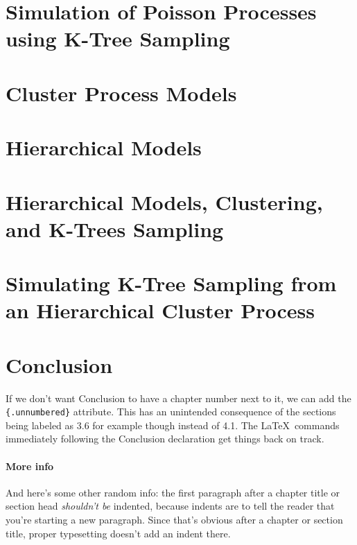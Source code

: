 \documentclass[12pt,twoside]{reedthesis}
\begin{document}
  \chapter{Simulation of Poisson Processes using K-Tree
  Sampling}\label{simulation-of-poisson-processes-using-k-tree-sampling}
  
  \chapter{Cluster Process Models}\label{cluster-process-models}
  
  \chapter{Hierarchical Models}\label{hierarchical-models}
  
  \chapter{Hierarchical Models, Clustering, and K-Trees
  Sampling}\label{hierarchical-models-clustering-and-k-trees-sampling}
  
  \chapter{Simulating K-Tree Sampling from an Hierarchical Cluster
  Process}\label{simulating-k-tree-sampling-from-an-hierarchical-cluster-process}
  
  \chapter*{Conclusion}\label{conclusion}
  
  \setcounter{chapter}{4} \setcounter{section}{0}
  
  If we don't want Conclusion to have a chapter number next to it, we can
  add the \texttt{\{.unnumbered\}} attribute. This has an unintended
  consequence of the sections being labeled as 3.6 for example though
  instead of 4.1. The \LaTeX~commands immediately following the Conclusion
  declaration get things back on track.
  
  \subsubsection{More info}\label{more-info}
  
  And here's some other random info: the first paragraph after a chapter
  title or section head \emph{shouldn't be} indented, because indents are
  to tell the reader that you're starting a new paragraph. Since that's
  obvious after a chapter or section title, proper typesetting doesn't add
  an indent there.
  
\end{document}
